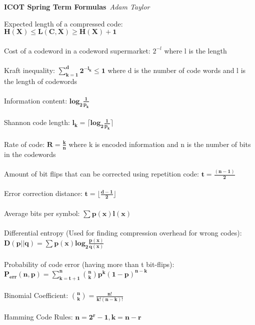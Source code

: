 \documentclass{article}
\begin{document}
\begin{center}
\Large\textbf{ICOT Spring Term Formulas}\
\large\textit{Adam Taylor}
\newline
\end{center}
Expected length of a compressed code: \\
$\mathbf{H(X) \leq L(C,X)\geq H(X)+1}$\\\\
Cost of a codeword in a codeword supermarket: $2^{-l}$ where l is the length \\\\
Kraft inequality: $\mathbf{\sum\limits_{k=1}^{d}2^{{-l_k}}\leq1}$ where d is the number of code words and l is the length of codewords\\\\
Information content: $\mathbf{log_2\frac{1}{p_k}}$\\\\
Shannon code length: $\mathbf {l_k = \lceil log_2\frac{1}{p_k}\rceil }$\\\\
Rate of code: $\mathbf{R=\frac{k}{n}}$ where k is encoded information and n is the number of bits in the codewords\\\\
Amount of bit flips that can be corrected using repetition code: $\mathbf{t = \frac{(n-1)}{2}}$\\\\
Error correction distance: $\mathbf{t=\lfloor\frac{d-1}{2}\rfloor}$\\\\
Average bits per symbol: $\mathbf{\sum p(x)l(x)}$\\\\
Differential entropy (Used for finding compression overhead for wrong codes):$\mathbf{D(p||q)=\sum p(x)log_2\frac{p(x)}{q(x)}}$\\\\
Probability of code error (having more than t bit-flips):\\ $\mathbf{P_{err}(n,p) = \sum\limits_{k=t+1}^{n}{n\choose k}p^k(1-p)^{n-k}}$\\\\
Binomial Coefficient: $\mathbf{{n\choose k} = \frac{n!}{k!(n-k)!}}$\\\\
Hamming Code Rules: $\mathbf{n = 2^r -1 , k = n - r}$\\\\
\end{document}
